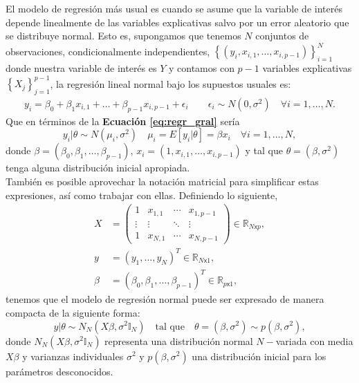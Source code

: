 El modelo de regresión más usual es cuando se asume que la variable de interés depende linealmente de las variables explicativas salvo por un error aleatorio que se distribuye normal. Esto es, supongamos que tenemos $N$ conjuntos de observaciones, condicionalmente independientes, $\left\lbrace(y_i,x_{i,1},\dots,x_{i,p-1})\right\rbrace_{i=1}^{N}$ donde nuestra variable de interés es $Y$ y contamos con $p-1$ variables explicativas $\left\lbrace X_j\right\rbrace_{j=1}^{p-1}$, la regresión lineal normal bajo los supuestos usuales es: 
\begin{align*} 
y_i = \beta_0 + \beta_1 x_{i,1} + \dots + \beta_{p-1} x_{i,p-1} + \epsilon_i \qquad \epsilon_i \sim N(0,\sigma^2) \quad \forall i = 1,\dots, N. 
\end{align*}
Que en términos de la \textbf{Ecuación \ref{eq:regr_gral}} sería
\begin{equation}
y_i|\theta \sim N(\mu_i,\sigma^2) \quad \mu_i = E[y_i|\theta] = \beta x_i \quad \forall i = 1, \dots, N,
\end{equation}
donde $\beta = (\beta_0,\beta_1,\dots,\beta_{p-1})$, $x_i = (1,x_{i,1},\dots,x_{i,p-1})$ y tal que  $\theta = (\beta,\sigma^2)$ tenga alguna distribución inicial apropiada.\\ 

También es posible aprovechar la notación matricial para simplificar estas expresiones, así como trabajar con ellas. Definiendo lo siguiente,  
\begin{align*}
X &= 
\begin{pmatrix}
  1 & x_{1,1} & \cdots & x_{1,p-1} \\
  \vdots & \vdots & \ddots & \vdots  \\
  1 & x_{N,1} & \cdots & x_{N,p-1} 
\end{pmatrix} \in \mathbb{R}_{N\mathsf{x}p}, \\
y &= (y_1,\dots,y_N)^T \in \mathbb{R}_{N\mathsf{x}1},\\
\beta &= (\beta_0,\beta_1,\dots,\beta_{p-1})^T \in \mathbb{R}_{p\mathsf{x}1}, 
\end{align*}
tenemos que el modelo de regresión normal puede ser expresado de manera compacta de la siguiente forma: 
\begin{equation}\label{eq:modelo_normal_matricial}
y|\theta \sim N_N(X\beta,\sigma^2\mathbb{I}_N) \quad \text{tal que} \quad \theta = (\beta, \sigma^2) \sim p(\beta,\sigma^2), 
\end{equation} 
donde $N_N(X\beta,\sigma^2\mathbb{I}_N)$ representa una distribución normal $N-$variada con media $X\beta$ y varianzas individuales $\sigma^2$ y $p(\beta,\sigma^2)$ una distribución inicial para los parámetros desconocidos. 

